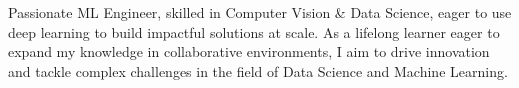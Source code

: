 {
Passionate ML Engineer, skilled in Computer Vision \& Data Science, eager to use deep learning to build impactful solutions at scale. As a lifelong learner eager to expand my knowledge in collaborative environments, I aim to drive innovation and tackle complex challenges in the field of Data Science and Machine Learning.
}

